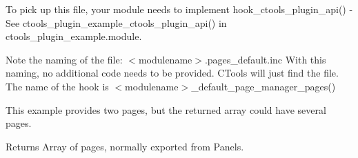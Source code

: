 To pick up this file, your module needs to implement hook\_\-ctools\_\-plugin\_\-api() -\/ See ctools\_\-plugin\_\-example\_\-ctools\_\-plugin\_\-api() in ctools\_\-plugin\_\-example.module.

Note the naming of the file: $<$modulename$>$.pages\_\-default.inc With this naming, no additional code needs to be provided. CTools will just find the file. The name of the hook is $<$modulename$>$\_\-default\_\-page\_\-manager\_\-pages()

This example provides two pages, but the returned array could have several pages.

\begin{DoxyReturn}{Returns}
Array of pages, normally exported from Panels. 
\end{DoxyReturn}
